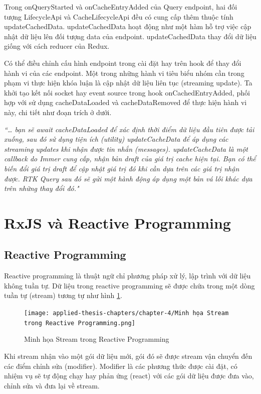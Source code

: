 Trong onQueryStarted và onCacheEntryAdded của Query endpoint, hai đối tượng LifecycleApi và CacheLifecycleApi đều có cung cấp thêm thuộc tính updateCachedData.
updateCachedData hoạt động như một hàm hỗ trợ việc cập nhật dữ liệu lên đối tượng data của endpoint.
updateCachedData thay đổi dữ liệu giống với cách reducer của Redux.
\par

Có thể điều chỉnh cấu hình endpoint trong cài đặt hay trên hook để thay đổi hành vi của các endpoint.
Một trong những hành vi tiêu biểu nhóm cần trong phạm vi thực hiện khóa luận là cập nhật dữ liệu liên tục (streaming update).
Ta khởi tạo kết nối socket hay event source trong hook onCachedEntryAdded, phối hợp với sử dụng cacheDataLoaded và cacheDataRemoved để thực hiện hành vi này, chi tiết như đoạn trích ở dưới.
\par

\textit{“… bạn sẽ await cacheDataLoaded để xác định thời điểm dữ liệu đầu tiên được tải xuống, sau đó sử dụng tiện ích (utility) updateCacheData để áp dụng các streaming updates khi nhận được tin nhắn (messages).
  updateCacheData là một callback do Immer cung cấp, nhận bản draft của giá trị cache hiện tại.
  Bạn có thể biến đổi giá trị draft để cập nhật giá trị đó khi cần dựa trên các giá trị nhận được.
  RTK Query sau đó sẽ gửi một hành động áp dụng một bản vá lỗi khác dựa trên những thay đổi đó."} \cite{chap4bib3}

\section{RxJS và Reactive Programming}

\subsection{Reactive Programming}

\tab Reactive programming là thuật ngữ chỉ phương pháp xử lý, lập trình với dữ liệu không tuần tự.
Dữ liệu trong reactive programming sẽ được chứa trong một dòng tuần tự (stream) tương tự như hình \ref{fig:StreamInRP}.

\begin{figure}[H]
  \centering
  \texttt{[image: applied-thesis-chapters/chapter-4/Minh họa Stream trong Reactive Programming.png]}
  \caption{Minh họa Stream trong Reactive Programming \cite{chap4bib4}}
  \label{fig:StreamInRP}
\end{figure}

Khi stream nhận vào một gói dữ liệu mới, gói đó sẽ được stream vận chuyển đến các điểm chỉnh sửa (modifier).
Modifier là các phương thức được cài đặt, có nhiệm vụ sẽ tự động chạy hay phản ứng (react) với các gói dữ liệu được đưa vào, chỉnh sửa và đưa lại về stream.
\par

